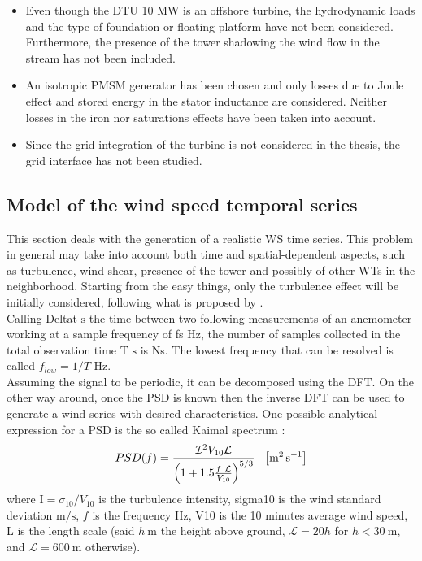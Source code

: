 \begin{itemize}
  \item Even though the DTU 10 MW is an offshore turbine, the hydrodynamic loads and  the type of foundation or floating platform have not been considered. Furthermore, the presence of the tower shadowing the wind flow in the stream has not been included.
  \item An isotropic PMSM generator has been chosen and only losses due to Joule effect and stored energy in the stator inductance are considered. Neither losses in the iron nor saturations effects have been taken into account.
  \item Since the grid integration of the turbine is not considered in the thesis, the grid interface has not been studied.    
\end{itemize}

\subsection[Wind speed temporal series]{Model of the wind speed temporal series}
This section deals with the generation of a realistic \acrshort{WS} time series. This problem in general may take into account both time and spatial-dependent aspects, such as turbulence, wind shear, presence of the tower and possibly of other WTs in the neighborhood. Starting from the easy things, only the turbulence effect will be initially considered, following what is proposed by \cite{Aerodynamics_of_wind_turbines}. \\
Calling \acrshort{Deltat} $\si{\second}$ the time between two following measurements of an anemometer working at a sample frequency of \acrshort{fs} $\si{\hertz}$, the number of samples collected in the total observation time \acrshort{T} $\si{\second}$ is \acrshort{Ns}. The lowest frequency that can be resolved is called $f_{low}=1/T$ $\si{\hertz}$. \\
Assuming the signal to be periodic, it can be decomposed using the \acrfull{DFT}. On the other way around, once the \acrfull{PSD} is known then the inverse \acrshort{DFT} can be used to generate a wind series with desired characteristics. One possible analytical expression for a \acrshort{PSD} is the so called Kaimal spectrum \cite{Aerodynamics_of_wind_turbines}:
\begin{equation}
    PSD(f) = \frac{\mathcal{I} ^2V_{10}\mathcal{L} }{\left(1+1.5\frac{f \ \mathcal{L} }{V_{10}}\right)^{5/3}} \ \ \mesunt{\square \meter \per \second}
    \label{eq:PSD}
\end{equation}
where \acrshort{I}$=\sigma_{10}/V_{10}$ is the turbulence intensity, \acrshort{sigma10} is the wind standard deviation $\si{\meter\per\second}$, $f$ is the frequency $\si{\hertz}$, \acrshort{V10} is the 10 minutes average wind speed, \acrshort{L} is the length scale (said $h \ \si{\meter}$ the height above ground, $\mathcal{L}=20h$ for $h<30 \ \si{\meter}$, and  $\mathcal{L}=600 \ \si{\meter}$ otherwise).\\
